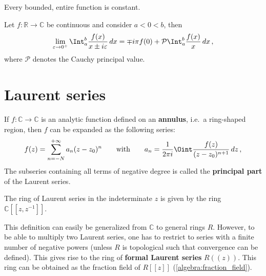     \begin{theorem}[Liouville]
        Every bounded, entire function is constant.
    \end{theorem}

    \begin{theorem}\label{complex:sokhotski_plemelj}
        Let $f:\mathbb{R}\rightarrow\mathbb{C}$ be continuous and consider $a<0<b$, then
        \begin{gather}
            \lim_{\varepsilon\rightarrow0^+}\Int_a^b\frac{f(x)}{x\pm i\varepsilon}\,dx = \mp i\pi f(0) + \mathcal{P}\Int_a^b\frac{f(x)}{x}\,dx\,,
        \end{gather}
        where $\mathcal{P}$ denotes the Cauchy principal value.

    \end{theorem}

\section{Laurent series}

    \begin{definition}\label{complex:laurent_series}
        If $f:\mathbb{C}\rightarrow\mathbb{C}$ is an analytic function defined on an \textbf{annulus}, i.e.~a ring-shaped region, then $f$ can be expanded as the following series:
        \begin{gather}
            f(z) = \sum^{+\infty}_{n=-N}a_n(z-z_0)^n \qquad\text{with}\qquad a_n = \frac{1}{2\pi i}\Oint\frac{f(z)}{(z-z_0)^{n+1}}\,dz\,,
        \end{gather}
        The subseries containing all terms of negative degree is called the \textbf{principal part} of the Laurent series. 
    \end{definition}
    \begin{notation}
        The ring of Laurent series in the indeterminate $z$ is given by the ring $\mathbb{C}[[z,z^{-1}]]$.
    \end{notation}

    \begin{remark}[Multiplication]
        This definition can easily be generalized from $\mathbb{C}$ to general rings $R$. However, to be able to multiply two Laurent series, one has to restrict to series with a finite number of negative powers (unless $R$ is topological such that convergence can be defined). This gives rise to the ring of \textbf{formal Laurent series} $R((z))$. This ring can be obtained as the fraction field of $R[[z]]$ (\cref{algebra:fraction_field}).
    \end{remark}

